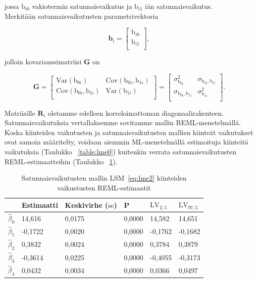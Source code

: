 \documentclass[finnish]{docopts}
\begin{document}
jossa $\text{b}_{i0}$ vakiotermin satunnaisvaikutus ja $\text{b}_{i1}$ iän satunnaisvaikutus.\\ 

Merkitään satunnaisvaikutusten parametrivektoria

$$
\bm{b}_i =
\begin{bmatrix}
\text{b}_{i0} \\
\text{b}_{i1} \\
\end{bmatrix},
$$

jolloin kovarianssimatriisi $\bm{G}$ on

$$
\bm{G} =
\begin{bmatrix}
\text{Var}(\text{b}_{0i}) & \text{Cov}(\text{b}_{0i}, \text{b}_{1i}) \\
\text{Cov}(\text{b}_{0i}, \text{b}_{1i}) & \text{Var}(\text{b}_{1i}) \\
\end{bmatrix} =
\begin{bmatrix}
\sigma^2_{\text{b}_{0i}} & \sigma_{\text{b}_{0i}, \text{b}_{1i}} \\
\sigma_{\text{b}_{0i}, \text{b}_{1i}} & \sigma^2_{\text{b}_{1i}} \\
\end{bmatrix}.
$$

Matriisille $\bm{R}_i$ oletamme edelleen korreloimattoman diagonaalirakenteen.\\

Satunnaisvaikutuksia vertallaksemme sovitamme mallin REML-menetelmällä. Koska kiinteiden vaikutusten ja satunnaisvaikutusten mallien kiinteät vaikutukset ovat samoin määritelty, voidaan aiemmin ML-menetelmällä estimoituja kiinteitä vaikutuksia (Taulukko ~\ref{table:lme0}) kuitenkin verrata satunnaisvaikutusten REML-estimaatteihin (Taulukko ~\ref{table:lme2}).

\begin{table}[H]
\centering
\begin{tabular}{llllll}
\toprule
  & Estimaatti & Keskivirhe ($\text{se}$) & P & $\text{LV}_{2,5}$ & $\text{LV}_{97,5}$\\
\midrule
$\hat{\beta}_0$ & 14,616 & 0,0175 & 0,0000 & 14,582 & 14,651\\
$\hat{\beta}_1$ & -0,1722 & 0,0020 & 0,0000 & -0,1762 & -0,1682\\
$\hat{\beta}_2$ & 0,3832 & 0,0024 & 0,0000 & 0,3784 & 0,3879\\
$\hat{\beta}_3$ & -0,3614 & 0,0225 & 0,0000 & -0,4055 & -0,3173\\
$\hat{\beta}_4$ & 0,0432 & 0,0034 & 0,0000 & 0,0366 & 0,0497\\
\bottomrule
\end{tabular}
\caption{Satunnaisvaikutusten mallin LSM~\ref{eq:lme2} kiinteiden vaikustusten REML-estimaatit}
\label{table:lme2}
\end{table}
\end{document}
